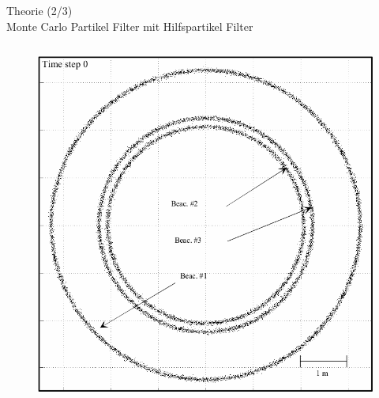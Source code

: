 \documentclass{beamer}
\begin{document}
%
%
\begin{frame}{Theorie (2/3)\\Monte Carlo Partikel Filter mit Hilfspartikel Filter}
	\begin{columns}
			\begin{overlayarea}{\textwidth}{.9\textheight}
				\only<1>
				{
					\begin{figure}
						\centering
						\includegraphics[width=\linewidth]{blanco2008pure_fig3e}
						\caption{\cite{blanco2008pure}}
					\end{figure}
				}
				{
					\begin{figure}
						\centering

\end{figure}}
\end{overlayarea}
\end{columns}
\end{frame}
\end{document}
